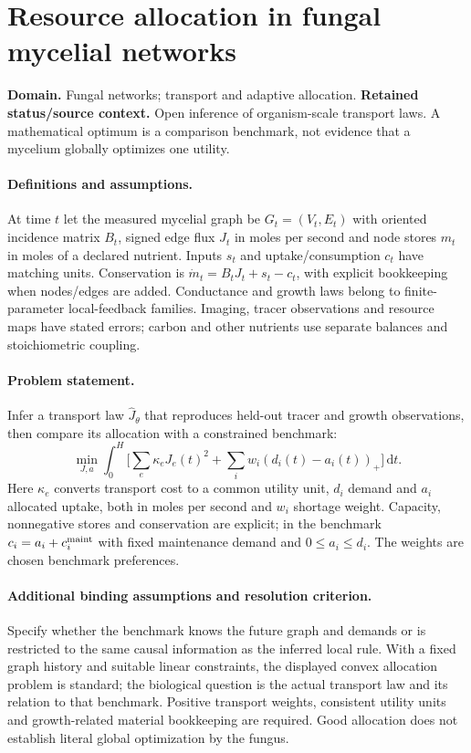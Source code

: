 \documentclass[11pt]{article}
\begin{document}
\section*{Resource allocation in fungal mycelial networks}
\label{prob:329}
\label{rank:318}
\par\smallskip

\noindent\textbf{Domain.} Fungal networks; transport and adaptive allocation. \quad \textbf{Retained status/source context.} Open inference of organism-scale transport laws. A mathematical optimum is a comparison benchmark, not evidence that a mycelium globally optimizes one utility.

\paragraph{Definitions and assumptions.} At time $t$ let the measured mycelial graph be $G_t=(V_t,E_t)$ with oriented incidence matrix $B_t$, signed edge flux $J_t$ in moles per second and node stores $m_t$ in moles of a declared nutrient. Inputs $s_t$ and uptake/consumption $c_t$ have matching units. Conservation is $\dot m_t=B_tJ_t+s_t-c_t$, with explicit bookkeeping when nodes/edges are added. Conductance and growth laws belong to finite-parameter local-feedback families. Imaging, tracer observations and resource maps have stated errors; carbon and other nutrients use separate balances and stoichiometric coupling.

\paragraph{Problem statement.} Infer a transport law $\widehat J_\theta$ that reproduces held-out tracer and growth observations, then compare its allocation with a constrained benchmark:
    \[\min_{J,a}\int_0^H\bigl[\sum_e\kappa_eJ_e(t)^2+
      \sum_iw_i(d_i(t)-a_i(t))_+\bigr]\,\mathrm{d} t.\]
    Here $\kappa_e$ converts transport cost to a common utility unit, $d_i$ demand and $a_i$ allocated uptake, both in moles per second and $w_i$ shortage weight. Capacity, nonnegative stores and conservation are explicit; in the benchmark $c_i=a_i+c_i^{\rm maint}$ with fixed maintenance demand and $0\leq a_i\leq d_i$. The weights are chosen benchmark preferences.

\paragraph{Additional binding assumptions and resolution criterion.} Specify whether the benchmark knows the future graph and demands or is restricted to the same causal information as the inferred local rule. With a fixed graph history and suitable linear constraints, the displayed convex allocation problem is standard; the biological question is the actual transport law and its relation to that benchmark. Positive transport weights, consistent utility units and growth-related material bookkeeping are required. Good allocation does not establish literal global optimization by the fungus.
\end{document}
